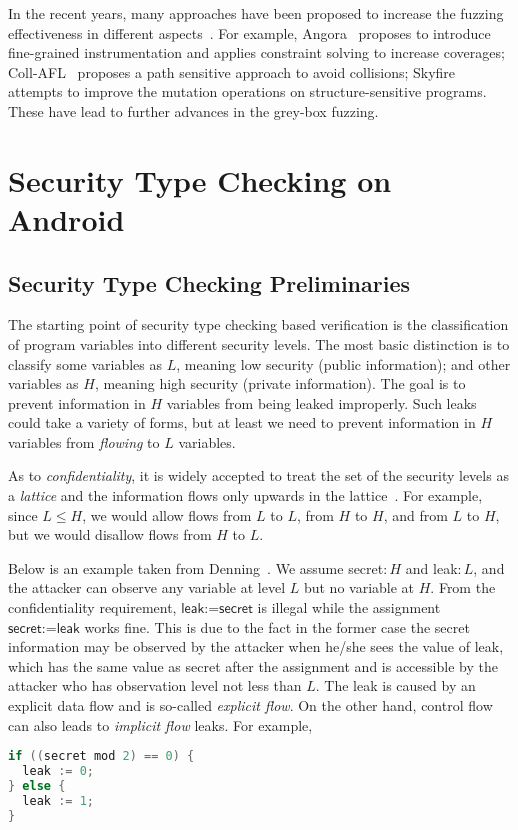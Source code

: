 In the recent years, many approaches have been proposed to increase the fuzzing effectiveness in different aspects~\cite{Bohme:2016:CGF,LiCMLLT17,Bohme:2017:DGF,FairFuzz,CollAFL,Angora,nezha,fuzz_survey}. For example, Angora~\cite{Angora} proposes to introduce fine-grained instrumentation and applies constraint solving to increase coverages; Coll-AFL~\cite{CollAFL} proposes a path sensitive approach to avoid collisions; Skyfire~\cite{junjie:2017sp:skyfire} attempts to improve the mutation operations on structure-sensitive programs. These have lead to further advances in the grey-box fuzzing.

\section{Security Type Checking on Android}\label{sec:intro-sta}

\subsection{Security Type Checking Preliminaries}

The starting point of security type checking based verification is the classification of program variables into different security levels. The most basic distinction is to classify some variables as $L$, meaning low security (public information); and other variables as $H$, meaning high security (private information). The goal is to prevent information in $H$ variables from being leaked improperly. Such leaks could take a variety of forms, but at least we need to prevent information in $H$ variables from \emph{flowing} to $L$ variables.

As to \emph{confidentiality}, it is widely accepted to treat the set of the security levels as a  \emph{lattice} and the information flows only upwards in the lattice~\cite{Denning:1977hwa}. For example, since $L\leq H$, we would allow flows from $L$ to $L$, from $H$ to $H$, and from $L$ to $H$, but we would disallow flows from $H$ to $L$.

Below is an example taken from Denning~\cite{Denning:1976cl}. We assume \textsf{secret}$:H$ and \textsf{leak}$:L$, and the attacker can observe any variable at level $L$ but no variable at $H$.
From the confidentiality requirement, $\textsf{leak:=secret}$ is illegal while the assignment $\textsf{secret:=leak}$ works fine. This is due to the fact in the former case the secret information may be observed by the attacker when he/she sees the value of \textsf{leak}, which has the same value as \textsf{secret} after the assignment and is accessible by the attacker who has observation level not less than $L$. The leak is caused by an explicit data flow and is so-called \emph{explicit flow}. On the other hand, control flow can also leads to \emph{implicit flow} leaks. For example,
\begin{lstlisting}[language=c,float=h]
if ((secret mod 2) == 0) {
  leak := 0;
} else {
  leak := 1;	
}  
\end{lstlisting}

